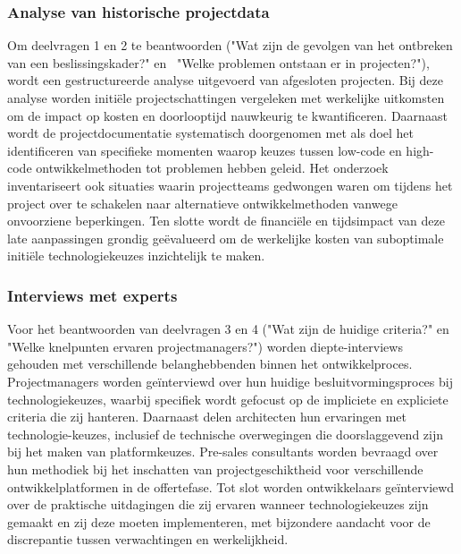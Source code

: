 \subsubsection{Analyse van historische projectdata}
Om deelvragen 1 en 2 te beantwoorden ("Wat zijn de gevolgen van het ontbreken van een beslissingskader?" \; \hbox{en} \, "Welke problemen ontstaan er in projecten?"), wordt een gestructureerde analyse uitgevoerd van afgesloten projecten. Bij deze analyse worden initiële projectschattingen vergeleken met werkelijke uitkomsten om de impact op kosten en doorlooptijd nauwkeurig te kwantificeren. Daarnaast wordt de projectdocumentatie systematisch doorgenomen met als doel het identificeren van specifieke momenten waarop keuzes tussen low-code en high-code ontwikkelmethoden tot problemen hebben geleid. Het onderzoek inventariseert ook situaties waarin projectteams gedwongen waren om tijdens het project over te schakelen naar alternatieve ontwikkelmethoden vanwege onvoorziene beperkingen. Ten slotte wordt de financiële en tijdsimpact van deze late aanpassingen grondig geëvalueerd om de werkelijke kosten van suboptimale initiële technologiekeuzes inzichtelijk te maken.
\subsubsection{Interviews met experts}
Voor het beantwoorden van deelvragen 3 en 4 ("Wat zijn de huidige criteria?" \; \hbox{en} \, "Welke knelpunten ervaren projectmanagers?") worden diepte-interviews gehouden met verschillende belanghebbenden binnen het ontwikkelproces. Projectmanagers worden geïnterviewd over hun huidige besluitvormingsproces bij technologiekeuzes, waarbij specifiek wordt gefocust op de impliciete en expliciete criteria die zij hanteren. Daarnaast delen architecten hun ervaringen met technologie-keuzes, inclusief de technische overwegingen die doorslaggevend zijn bij het maken van platformkeuzes. Pre-sales consultants worden bevraagd over hun methodiek bij het inschatten van projectgeschiktheid voor verschillende ontwikkelplatformen in de offertefase. Tot slot worden ontwikkelaars geïnterviewd over de praktische uitdagingen die zij ervaren wanneer technologiekeuzes zijn gemaakt en zij deze moeten implementeren, met bijzondere aandacht voor de discrepantie tussen verwachtingen en werkelijkheid.
